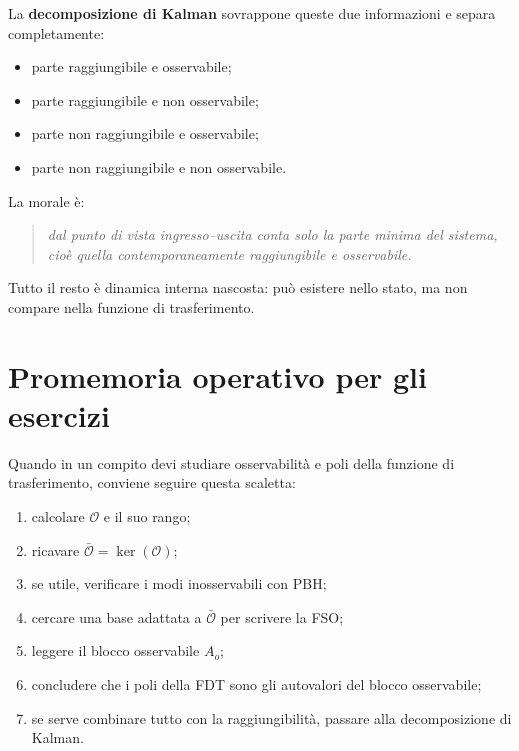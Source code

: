 La \textbf{decomposizione di Kalman} sovrappone queste due informazioni e separa completamente:
\begin{itemize}
    \item parte raggiungibile e osservabile;
    \item parte raggiungibile e non osservabile;
    \item parte non raggiungibile e osservabile;
    \item parte non raggiungibile e non osservabile.
\end{itemize}

La morale è:

\begin{quote}
\emph{dal punto di vista ingresso--uscita conta solo la parte minima del sistema, cioè quella contemporaneamente raggiungibile e osservabile.}
\end{quote}

Tutto il resto è dinamica interna nascosta: può esistere nello stato, ma non compare nella funzione di trasferimento.

\bigskip

\section*{Promemoria operativo per gli esercizi}

Quando in un compito devi studiare osservabilità e poli della funzione di trasferimento, conviene seguire questa scaletta:

\begin{enumerate}
    \item calcolare \(\mathcal O\) e il suo rango;
    \item ricavare \(\bar{\mathcal O}=\ker(\mathcal O)\);
    \item se utile, verificare i modi inosservabili con PBH;
    \item cercare una base adattata a \(\bar{\mathcal O}\) per scrivere la FSO;
    \item leggere il blocco osservabile \(A_o\);
    \item concludere che i poli della FDT sono gli autovalori del blocco osservabile;
    \item se serve combinare tutto con la raggiungibilità, passare alla decomposizione di Kalman.
\end{enumerate}